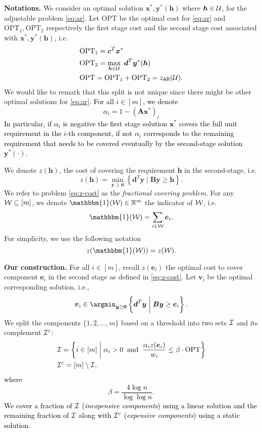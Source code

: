 \documentclass[moor]{informs1}              %
\newcommand{\opt}{\mathrm{OPT}}
\newcommand{\mb}[1]{\ensuremath{\boldsymbol{#1}}}
\newcommand*{\red}{\textcolor{black}}
\begin{document}
\vspace{2mm}
\noindent
{\bf Notations.}
We consider an optimal solution $ \mb x^*,  \mb y^*( \mb h) $ where $ \mb h \in {\cal U}$, for the adjustable problem \eqref{eq:ar}. Let $\opt$ be the optimal cost for \eqref{eq:ar} and ${\opt}_1, {\opt}_2$ respectively the first stage cost and the second stage cost associated with $ \mb x^*,  \mb y^*( \mb h) $, i.e. 
\begin{align*}
&{\opt}_1 = \mb c^T \mb x^*  \\
&{\opt}_2 = \max_{ \mb h \in {\cal U}} \; \mb d^T \mb y^* ( \mb h ) \\
 &{\opt}  ={\opt}_1+{\opt}_2 = z_{\sf AR}({\cal U}).
\end{align*}
We would like to remark that this split is not unique since there might be other optimal solutions for \eqref{eq:ar}. \red{ For all $i \in [m]$, we denote
$$ \alpha_i = 1 -( \mb A \mb x^*)_i$$
In particular, if $\alpha_i$ is negative the first stage solution $\mb x^*$ covers the full unit requirement in the $i$-th component, if not $\alpha_i$ corresponds  to the remaining requirement that needs to be covered eventually by the second-stage solution $\mb y^*(\cdot)$.}

We denote $z(\mb h )$, the cost of covering the requirement $\mb h$ in the second-stage, i.e.  
\begin{equation} \label{eq:z-cost}
 z(\mb h ) = \min_{\mb y \geq \mb 0} \left\{ \mb d^T \mb y \; \bigg\vert \; \mb B \mb y \geq \mb h \right\}.
\end{equation}
We refer to problem \eqref{eq:z-cost} as the \textit{fractional covering problem}. For  any ${\cal W} \subseteq [m]$, we denote $\mathbbm{1}({\cal W}) \in \mathbb{R}^m$ the indicator of ${\cal W}$, i.e. 
$$\mathbbm{1}({\cal W})= \sum_{i \in {\cal W}} \mb e_i.$$ 
For simplicity, we use the following notation 
$$z(\mathbbm{1}({\cal W}) )= z( {\cal W}).$$


\vspace{2mm}
\noindent
{\bf Our construction.}
For all $i \in [m]$, recall $z(\mb e_i)$  the optimal cost to cover component $\mb e_i$ in the second stage as defined in \eqref{eq:z-cost}. Let ${\mb v}_i$ be the optimal corresponding solution, i.e.,
$$ \mb v_i \in  \argmin_{\mb y \geq \mb 0} \left\{ \mb d^T \mb y \; \bigg\vert \;   \mb B \mb y \geq  \mb e_i  \right\}.$$
We split the components $\{ 1,2, \ldots,m\}$ based on a threshold into two sets ${\cal I}$ and its complement ${\cal I}^c$:
\begin{align*}
& {\cal I} = \left\{ i \in [m] \; \bigg\vert \;  \alpha_i  >0  \;\; \text{and}  \; \; \frac{ \alpha_i z(\mb e_i)}{w_i}   \leq \beta \cdot \opt \right\} \\
&{\cal I}^c =[m] \setminus  {\cal I},
\end{align*}
\red{where $$ \beta =   \frac{4 \log n}{\log \log n} .$$}
\red{We cover  a fraction of ${\cal I}$ (\textit{inexpensive components}) using a linear solution and  the remaining fraction of $\cal I$ along with  ${\cal I}^c$ (\textit{expensive components}) using a static solution. }
\end{document}
